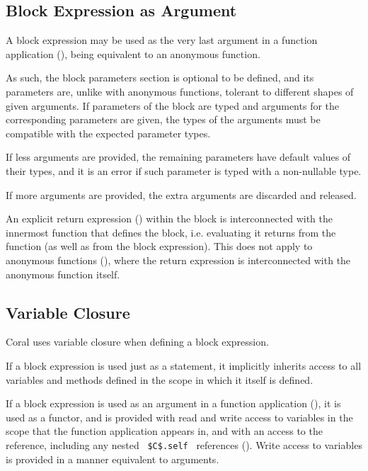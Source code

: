 \subsection{Block Expression as Argument}
\label{sec:block-arguments}

A block expression may be used as the very last argument in a function application (), being equivalent to an anonymous function. 

As such, the block parameters section is optional to be defined, and its parameters are, unlike with anonymous functions, tolerant to different shapes of given arguments. If parameters of the block are typed and arguments for the corresponding parameters are given, the types of the arguments must be compatible with the expected parameter types. 

If less arguments are provided, the remaining parameters have default values of their types, and it is an error if such parameter is typed with a non-nullable type. 

If more arguments are provided, the extra arguments are discarded and released. 

An explicit return expression () within the block is interconnected with the innermost function that defines the block, i.e. evaluating it returns from the function (as well as from the block expression). This does not apply to anonymous functions (), where the return expression is interconnected with the anonymous function itself. 






\subsection{Variable Closure}
\label{sec:variable-closure}

Coral uses variable closure when defining a block expression. 

If a block expression is used just as a statement, it implicitly inherits access to all variables and methods defined in the scope in which it itself is defined. 

If a block expression is used as an argument in a function application (), it is used as a functor, and is provided with read and write access to variables in the scope that the function application appears in, and with an access to the  reference, including any nested ~\lstinline!$C$.self!~ references (). Write access to variables is provided in a manner equivalent to  arguments. 

